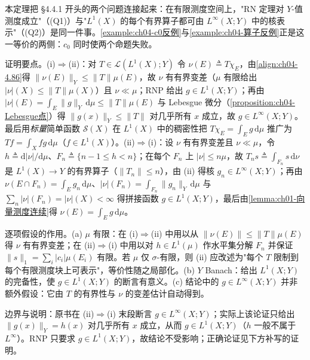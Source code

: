 \documentclass[../../main.tex]{subfiles}%
\begin{document}
\begin{remark}\label{remark:ch04-RNP与可表示}
本定理把 §4.4.1 开头的两个问题连接起来：在有限测度空间上，"RN 定理对 $Y$-值测度成立"（(Q1)）与"$L^1(X)$ 的每个有界算子都可由 $L^\infty(X;Y)$ 中的核表示"（(Q2)）是同一件事。\cref{example:ch04-c0反例}与\cref{example:ch04-算子反例}正是这一等价的两侧：$c_0$ 同时使两个命题失败。

证明要点。(i)$\Rightarrow$(ii)：对 $T\in\mathcal{L}(L^1(X);Y)$ 令 $\nu(E)\triangleq T\chi_E$，由\eqref{align:ch04-4.86}得 $\|\nu(E)\|_Y\leqslant\|T\|\mu(E)$，故 $\nu$ 有有界变差（$\mu$ 有限给出 $|\nu|(X)\leqslant\|T\|\mu(X)$）且 $\nu\ll\mu$；RNP 给出 $g\in L^1(X;Y)$；再由 $|\nu|(E)=\int_E\|g\|_Y\,\mathrm{d}\mu\leqslant\|T\|\mu(E)$ 与 Lebesgue 微分（\cref{proposition:ch04-Lebesgue点}）得 $\|g(x)\|_Y\leqslant\|T\|$ 对几乎所有 $x$ 成立，故 $g\in L^\infty(X;Y)$。最后用\emph{标量}简单函数 $\mathcal{S}(X)$ 在 $L^1(X)$ 中的稠密性把 $T\chi_E=\int_E g\,\mathrm{d}\mu$ 推广为 $Tf=\int_X fg\,\mathrm{d}\mu$（$f\in L^1(X)$）。(ii)$\Rightarrow$(i)：设 $\nu$ 有有界变差且 $\nu\ll\mu$，令 $h\triangleq\mathrm{d}|\nu|/\mathrm{d}\mu$、$F_n\triangleq\{n-1\leqslant h<n\}$；在每个 $F_n$ 上 $|\nu|\leqslant n\mu$，故 $T_ns\triangleq\int_{F_n}s\,\mathrm{d}\nu$ 是 $L^1(X)\to Y$ 的有界算子（$\|T_n\|\leqslant n$），由 (ii) 得核 $g_n\in L^\infty(X;Y)$；再由 $\nu(E\cap F_n)=\int_E g_n\,\mathrm{d}\mu$、$|\nu|(F_n)=\int_{F_n}\|g_n\|_Y\,\mathrm{d}\mu$ 与 $\sum_n|\nu|(F_n)=|\nu|(X)<\infty$ 得拼接函数 $g\in L^1(X;Y)$，最后由\cref{lemma:ch01-向量测度连续}得 $\nu(E)=\int_E g\,\mathrm{d}\mu$。

逐项假设的作用。(a) $\mu$ 有限：在 (i)$\Rightarrow$(ii) 中用以从 $\|\nu(E)\|\leqslant\|T\|\mu(E)$ 得 $\nu$ 有有界变差；在 (ii)$\Rightarrow$(i) 中用以对 $h\in L^1(\mu)$ 作水平集分解 $F_n$ 并保证 $\|s\|_1=\sum_i|c_i|\mu(E_i)$ 有限。若 $\mu$ 仅 $\sigma$-有限，则 (ii) 应改述为"每个 $T$ 限制到每个有限测度块上可表示"，等价性随之局部化。(b) $Y$ Banach：给出 $L^1(X;Y)$ 的完备性，使 $g\in L^1(X;Y)$ 的断言有意义。(c) 结论中的 $g\in L^\infty(X;Y)$ 并非额外假设：它由 $T$ 的有界性与 $\nu$ 的变差估计自动得到。

边界与说明：原书在 (ii)$\Rightarrow$(i) 末段断言 $g\in L^\infty(X;Y)$；实际上该论证只给出 $\|g(x)\|_Y=h(x)$ 对几乎所有 $x$ 成立，从而 $g\in L^1(X;Y)$（$h$ 一般不属于 $L^\infty$）。RNP 只要求 $g\in L^1(X;Y)$，故结论不受影响；正确论证见下方补写的证明。
\end{remark}
\end{document}
